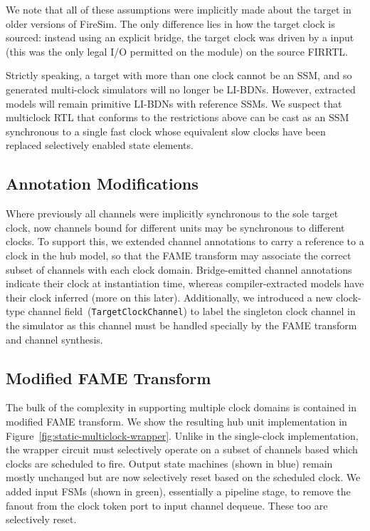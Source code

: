 We note that all of these assumptions were implicitly made about the target in
older versions of FireSim. The only difference lies in how the target clock is
sourced: instead using an explicit bridge, the target clock was driven by a
input (this was the only legal I/O permitted on the module) on the source
FIRRTL.

Strictly speaking, a target with more than one clock cannot be an SSM, and so
generated multi-clock simulators will no longer be LI-BDNs. However, extracted
models will remain primitive LI-BDNs with reference SSMs.  We suspect that
multiclock RTL that conforms to the restrictions above can be cast as an SSM
synchronous to a single fast clock whose equivalent slow clocks have been
replaced selectively enabled state elements.

\subsection{Annotation Modifications}

Where previously all channels were implicitly synchronous to the sole target
clock, now channels bound for different units may be synchronous to different
clocks. To support this, we extended channel annotations to carry a reference
to a clock in the hub model, so that the FAME transform may associate the
correct subset of channels with each clock domain. Bridge-emitted channel
annotations indicate their clock at instantiation time,
whereas compiler-extracted models have their clock inferred (more on this
later). Additionally, we introduced a new clock-type channel
field~(\texttt{TargetClockChannel}) to label the singleton clock channel in the
simulator as this channel must be handled specially by the FAME transform and channel
synthesis.

\subsection{Modified FAME Transform}
The bulk of the complexity in supporting multiple clock domains is contained in
modified FAME transform. We show the resulting hub unit implementation in
Figure~\ref{fig:static-multiclock-wrapper}. Unlike in the single-clock
implementation, the wrapper circuit must selectively operate on a subset of
channels based which clocks are scheduled to fire.  Output state machines (shown in
blue) remain mostly unchanged but are now selectively reset based on the
scheduled clock.  We added input FSMs (shown in green), essentially a pipeline stage, to remove the fanout from
the clock token port to input channel dequeue. These too are selectively reset.

